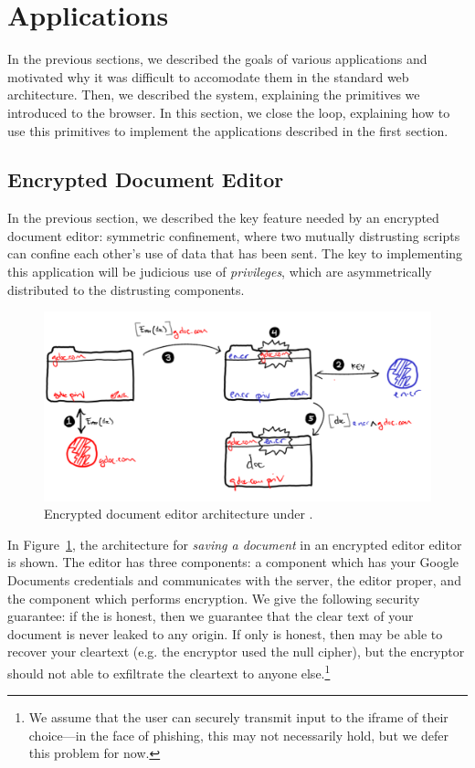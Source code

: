\section{Applications}

In the previous sections, we described the goals of various applications
and motivated why it was difficult to accomodate them in the standard
web architecture.  Then, we described the \sys{} system, explaining the
primitives we introduced to the browser.  In this section, we close the
loop, explaining how to use this primitives to implement the
applications described in the first section.

\subsection{Encrypted Document Editor}

In the previous section, we described the key feature needed by an
encrypted document editor: symmetric confinement, where two mutually
distrusting scripts can confine each other's use of data that has been
sent.  The key to implementing this application will be judicious use of
\emph{privileges}, which are asymmetrically distributed to the
distrusting components.

\begin{figure}
\centerline{\includegraphics[width=\columnwidth]{editor2-byhand}}
\caption{\label{fig:editor} Encrypted document editor architecture
under \sys{}.}
\end{figure}

In Figure~\ref{fig:editor}, the architecture for \emph{saving a
document} in an encrypted editor editor is shown.  The editor has three
components: a component which has your Google Documents credentials and
communicates with the server, the editor proper, and the component which
performs encryption.  We give the following security guarantee: if the
 is honest, then we guarantee that the clear text of your document
is never leaked to any origin.  If only  is honest, then
 may be able to recover your cleartext (e.g. the encryptor
used the null cipher), but the encryptor should not able to exfiltrate the
cleartext to anyone else.\footnote{We assume that the user can securely
transmit input to the iframe of their choice---in the face of phishing,
this may not necessarily hold, but we defer this problem for now.}

